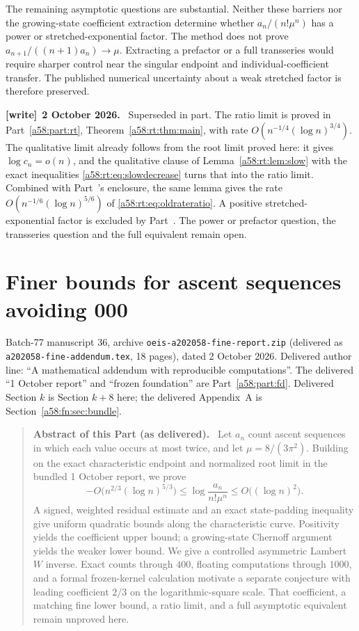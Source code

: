 \documentclass[11pt,letterpaper]{article}
\newcommand{\file}[1]{\nolinkurl{#1}}
\theoremstyle{remark}
\newenvironment{writenote}[1][]{\par\smallskip\begingroup\small
 \noindent\textbf{[write]}\if\relax\detokenize{#1}\relax\else~\textbf{#1.}\fi\ }%
 {\par\endgroup\smallskip}
\newenvironment{partabstract}{\begin{quote}\small\noindent\textbf{Abstract of this Part (as delivered).}\ }{\end{quote}}
\newcommand{\partsource}[1]{\par\noindent\begin{minipage}{\textwidth}\small #1\end{minipage}\par\medskip}
\begin{document}
The remaining asymptotic questions are substantial. Neither these barriers nor the growing-state coefficient extraction determine whether $a_n/(n!\mu^n)$ has a power or stretched-exponential factor. The method does not prove $a_{n+1}/((n+1)a_n)\to\mu$. Extracting a prefactor or a full transseries would require sharper control near the singular endpoint and individual-coefficient transfer. The published numerical uncertainty about a weak stretched factor is therefore preserved.
\begin{writenote}[2 October 2026]
Superseded in part. The ratio limit is proved in Part~\ref{a58:part:rt}, Theorem~\ref{a58:rt:thm:main}, with rate $O(n^{-1/4}(\log n)^{3/4})$. The qualitative limit already follows from the root limit proved here: it gives $\log c_n=o(n)$, and the qualitative clause of Lemma~\ref{a58:rt:lem:slow} with the exact inequalities \eqref{a58:rt:eq:slowdecrease} turns that into the ratio limit. Combined with Part~\ref{a58:part:fn}'s enclosure, the same lemma gives the rate $O(n^{-1/6}(\log n)^{5/6})$ of \eqref{a58:rt:eq:oldrateratio}. A positive stretched-exponential factor is excluded by Part~\ref{a58:part:fn}. The power or prefactor question, the transseries question and the full equivalent remain open.
\end{writenote}

\clearpage
\part{Finer bounds for ascent sequences avoiding 000}\label{a58:part:fn}
\partsource{Batch-77 manuscript 36, archive \file{oeis-a202058-fine-report.zip} (delivered as \file{a202058-fine-addendum.tex}, 18 pages), dated 2 October 2026. Delivered author line: ``A mathematical addendum with reproducible computations''. The delivered ``1 October report'' and ``frozen foundation'' are Part~\ref{a58:part:fd}. Delivered Section $k$ is Section $k+8$ here; the delivered Appendix~A is Section~\ref{a58:fn:sec:bundle}.}
\begin{partabstract}
Let $a_n$ count ascent sequences in which each value occurs at most twice, and let $\mu=8/(3\pi^2)$. Building on the exact characteristic endpoint and normalized root limit in the bundled 1 October report, we prove
\[
 -O\bigl(n^{2/3}(\log n)^{5/3}\bigr)
 \le \log\frac{a_n}{n!\mu^n}
 \le O\bigl((\log n)^2\bigr).
\]
A signed, weighted residual estimate and an exact state-padding inequality give uniform quadratic bounds along the characteristic curve. Positivity yields the coefficient upper bound; a growing-state Chernoff argument yields the weaker lower bound. We give a controlled asymmetric Lambert $W$ inverse. Exact counts through $400$, floating computations through $1000$, and a formal frozen-kernel calculation motivate a separate conjecture with leading coefficient $2/3$ on the logarithmic-square scale. That coefficient, a matching fine lower bound, a ratio limit, and a full asymptotic equivalent remain unproved here.
\end{partabstract}
\end{document}
